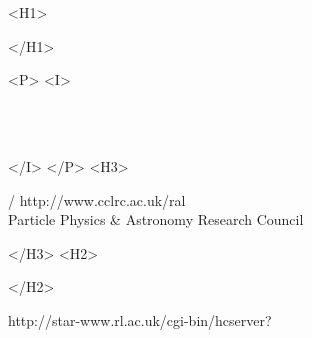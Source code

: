 \begin{htmlonly}
   \xlabel{}
   \begin{rawhtml} <H1> \end{rawhtml}
      \stardoctitle
   \begin{rawhtml} </H1> \end{rawhtml}


   \begin{rawhtml} <P> <I> \end{rawhtml}
   \stardoccategory \stardocnumber \\
   \stardocauthors \\
   \stardocdate
   \begin{rawhtml} </I> </P> <H3> \end{rawhtml}
       /
                        {http://www.cclrc.ac.uk/ral} \\
      Particle Physics \& Astronomy Research Council \\
   \begin{rawhtml} </H3> <H2> \end{rawhtml}
   \begin{rawhtml} </H2> \end{rawhtml}
      {http://star-www.rl.ac.uk/cgi-bin/hcserver?\stardocsource}\\



\end{htmlonly}

